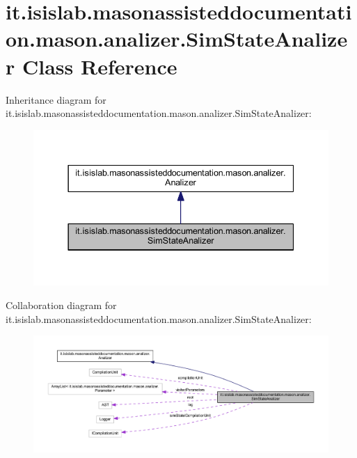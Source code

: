 \hypertarget{classit_1_1isislab_1_1masonassisteddocumentation_1_1mason_1_1analizer_1_1_sim_state_analizer}{\section{it.\-isislab.\-masonassisteddocumentation.\-mason.\-analizer.\-Sim\-State\-Analizer Class Reference}
\label{classit_1_1isislab_1_1masonassisteddocumentation_1_1mason_1_1analizer_1_1_sim_state_analizer}
}


Inheritance diagram for it.\-isislab.\-masonassisteddocumentation.\-mason.\-analizer.\-Sim\-State\-Analizer\-:
\nopagebreak
\begin{figure}[H]
\begin{center}
\leavevmode
\includegraphics[width=337pt]{classit_1_1isislab_1_1masonassisteddocumentation_1_1mason_1_1analizer_1_1_sim_state_analizer__inherit__graph}
\end{center}
\end{figure}


Collaboration diagram for it.\-isislab.\-masonassisteddocumentation.\-mason.\-analizer.\-Sim\-State\-Analizer\-:
\nopagebreak
\begin{figure}[H]
\begin{center}
\leavevmode
\includegraphics[width=350pt]{classit_1_1isislab_1_1masonassisteddocumentation_1_1mason_1_1analizer_1_1_sim_state_analizer__coll__graph}
\end{center}
\end{figure}

